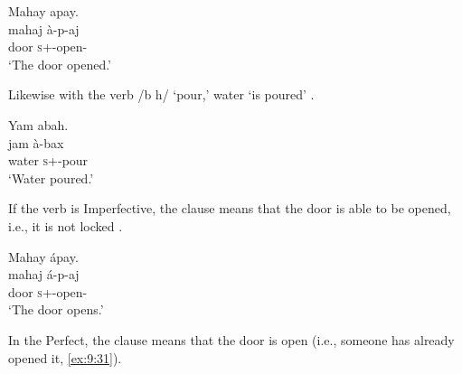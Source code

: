 \ea \label{ex:9:28}
Mahay  apay.\\
\gll  mahaj à-p-aj\\
      door  \textsc{s}+{\PFV}-open{}-{\CL}\\
\glt  ‘The door opened.’
\z

Likewise with the verb /b h/ ‘pour,’ water ‘is poured’ .  

\ea \label{ex:9:29}
Yam  abah.\\
\gll  jam     à-bax\\
      water  \textsc{s}+{\PFV}-pour\\
\glt  ‘Water poured.’
\z

If the verb is Imperfective, the clause means that the door is able to be opened, i.e., it is not locked .

\ea \label{ex:9:30}
Mahay  ápay.\\
\gll  mahaj   á-p-aj\\
      door  \textsc{s}+{\IFV}-open{}-{\CL}\\
\glt  ‘The door opens.’
\z

In the Perfect, the clause means that the door is open (i.e., someone has already opened it, \ref{ex:9:31}).


